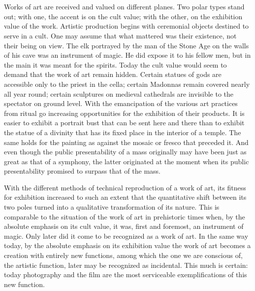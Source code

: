 \documentclass[11pt, letterpaper]{article}
\begin{document}
\section{}

Works of art are received and valued on different planes. Two polar types stand
out; with one, the accent is on the cult value; with the other, on the
exhibition value of the work. Artistic production begins with ceremonial
objects destined to serve in a cult. One may assume that what mattered was
their existence, not their being on view. The elk portrayed by the man of the
Stone Age on the walls of his cave was an instrument of magic. He did expose it
to his fellow men, but in the main it was meant for the spirits. Today the cult
value would seem to demand that the work of art remain hidden. Certain statues
of gods are accessible only to the priest in the cella; certain Madonnas remain
covered nearly all year round; certain sculptures on medieval cathedrals are
invisible to the spectator on ground level. With the emancipation of the
various art practices from ritual go increasing opportunities for the
exhibition of their products. It is easier to exhibit a portrait bust that can
be sent here and there than to exhibit the statue of a divinity that has its
fixed place in the interior of a temple. The same holds for the painting as
against the mosaic or fresco that preceded it. And even though the public
presentability of a mass originally may have been just as great as that of a
symphony, the latter originated at the moment when its public presentability
promised to surpass that of the mass.

With the different methods of technical reproduction of a work of art, its
fitness for exhibition increased to such an extent that the quantitative shift
between its two poles turned into a qualitative transformation of its nature.
This is comparable to the situation of the work of art in prehistoric times
when, by the absolute emphasis on its cult value, it was, first and foremost,
an instrument of magic. Only later did it come to be recognized as a work of
art. In the same way today, by the absolute emphasis on its exhibition value
the work of art becomes a creation with entirely new functions, among which the
one we are conscious of, the artistic function, later may be recognized as
incidental. This much is certain: today photography and the film are the most
serviceable exemplifications of this new function.

\section{}
\end{document}
